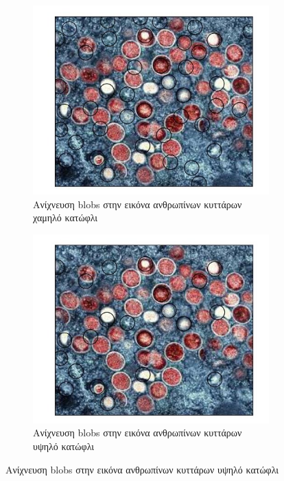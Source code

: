 \documentclass{article}
\newcommand{\eng}[1]{\foreignlanguage{english}{#1}}
\begin{document}
\begin{figure}[h]
    \centering
    \begin{subfigure}{.49\textwidth}
        \centering
        \includegraphics[width=\textwidth]{../image-plots/blob-detection-cells-bad-scaled.jpg}
        \caption{Aνίχνευση \eng{blobs} στην εικόνα ανθρωπίνων κυττάρων χαμηλό κατώφλι}
        \label{fig:cells-bad}
    \end{subfigure}
    \begin{subfigure}{.49\textwidth}
        \centering
        \includegraphics[width=\textwidth]{../image-plots/blob-detection-cells-good-scaled.jpg}
        \caption{Aνίχνευση \eng{blobs} στην εικόνα ανθρωπίνων κυττάρων υψηλό κατώφλι}
        \label{fig:cells-good}
    \end{subfigure}
\end{figure}
\FloatBarrier
\end{document}
